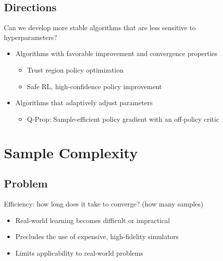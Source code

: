 \subsection{Directions}
Can we develop more stable algorithms that are less sensitive to hyperparameters?
\begin{itemize}
	\item Algorithms with favorable improvement and convergence properties
	\begin{itemize}
		\item Trust region policy optimization \cite{schulman2015icml}
		\item Safe \ac{RL}, high-confidence policy improvement
	\end{itemize}
	\item Algorithms that adaptively adjust parameters
	\begin{itemize}
		\item Q-Prop: Sample-efficient policy gradient with an off-policy critic \cite{gu2016q}
	\end{itemize}
\end{itemize}

\section{Sample Complexity}
\subsection{Problem}
Efficiency: how long does it take to converge? (how many samples)
\begin{itemize}
	\item Real-world learning becomes difficult or impractical
	\item Precludes the use of expensive, high-fidelity simulators
	\item Limits applicability to real-world problems
\end{itemize}
\cite{irpan18}

